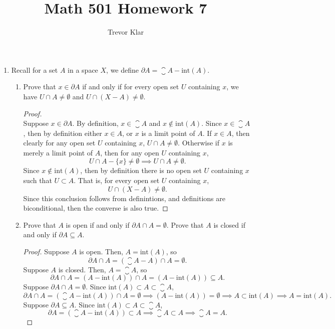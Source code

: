 \documentclass[letterpaper]{article}
\title{Math 501 \linebreak
Homework 7}
\author{Trevor Klar}
\begin{document}
\maketitle

\begin{enumerate}
\item Recall for a set $A$ in a space $X$, we define $\partial A = \closure{A}-\text{int}(A)$. 
	\begin{enumerate}
	\item Prove that $x \in \partial A$ if and only if for every open set $U$ containing $x$, we have $U\cap A \neq \emptyset$ and $U \cap (X-A)\neq \emptyset$. 
	\begin{proof}\mbox{}\\
	Suppose $x \in \partial A$. By definition, $x\in\closure{A}$ and $x\not\in\text{int}(A)$. Since $x\in\closure{A}$, then by definition either $x\in A$, or $x$ is a limit point of $A$. If $x\in A$, then clearly for any open set $U$ containing $x$, $U\cap A\neq \emptyset$. Otherwise if $x$ is merely a limit point of $A$, then for any open $U$ containing $x$, 
	$$U\cap A-\{x\}\neq \emptyset \implies U\cap A\neq \emptyset.$$
	Since $x\not\in\text{int}(A)$, then by definition there is no open set $U$ containing $x$ such that $U\subset A$. That is, for every open set $U$ containing $x$, 
	$$U\cap (X-A)\neq \emptyset.$$ 
	Since this conclusion follows from definintions, and definitions are biconditional, then the converse is also true.
	\end{proof}
	
	\item Prove that $A$ is open if and only if $\partial A \cap A = \emptyset$. Prove that $A$ is closed if and only if $\partial A \subseteq A$. 
	\begin{proof}
	Suppose $A$ is open. Then, $A=\text{int}(A)$, so 
	$$\partial A \cap A = (\closure{A}-A)\cap A = \emptyset.$$
	Suppose $A$ is closed. Then, $A=\closure{A}$, so 
	$$\partial A \cap A = (A-\text{int}(A))\cap A = (A-\text{int}(A))\subseteq A.$$
	Suppose $\partial A \cap A = \emptyset$. Since $\text{int}(A)\subset A\subset \closure{A}$, 
	$$\partial A \cap A = (\closure{A}-\text{int}(A))\cap A=\emptyset \implies (A-\text{int}(A))=\emptyset \implies A\subset\text{int}(A) \implies A=\text{int}(A).$$
	Suppose $\partial A \subseteq A$. Since $\text{int}(A)\subset A\subset \closure{A}$, 
	$$\partial A = (\closure{A}-\text{int}(A))\subset A \implies \closure{A}\subset A \implies \closure{A}= A.$$	
	\end{proof}
	\end{enumerate}


\end{enumerate}
\end{document}
